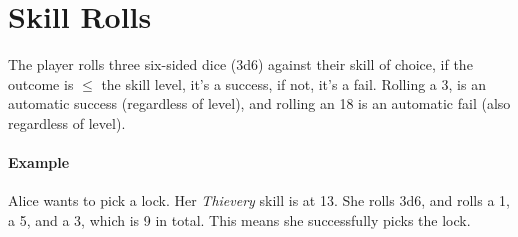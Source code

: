 \section{Skill Rolls}
The player rolls three six-sided dice (3d6) against their skill of choice, if the outcome is $\leq$ the skill level, it's a success, if not, it's a fail.
Rolling a 3, is an automatic success (regardless of level), and rolling an 18 is an automatic fail (also regardless of level).

\paragraph{Example} Alice wants to pick a lock. 
Her \textit{Thievery} skill is at 13. 
She rolls 3d6, and rolls a 1, a 5, and a 3, which is 9 in total. 
This means she successfully picks the lock.


